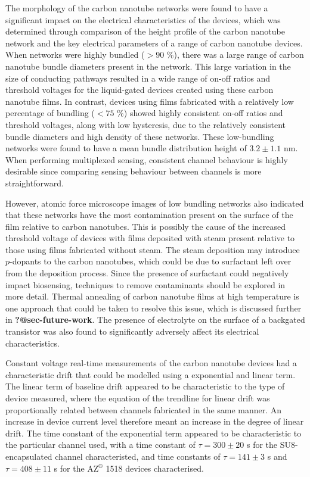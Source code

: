 \documentclass[
  a4paper,
]{scrbook}
\begin{document}
The morphology of the carbon nanotube networks were found to have a
significant impact on the electrical characteristics of the devices,
which was determined through comparison of the height profile of the
carbon nanotube network and the key electrical parameters of a range of
carbon nanotube devices. When networks were highly bundled (\(>90\) \%),
there was a large range of carbon nanotube bundle diameters present in
the network. This large variation in the size of conducting pathways
resulted in a wide range of on-off ratios and threshold voltages for the
liquid-gated devices created using these carbon nanotube films. In
contrast, devices using films fabricated with a relatively low
percentage of bundling (\(<75\) \%) showed highly consistent on-off
ratios and threshold voltages, along with low hysteresis, due to the
relatively consistent bundle diameters and high density of these
networks. These low-bundling networks were found to have a mean bundle
distribution height of \(3.2 \pm 1.1\) nm. When performing multiplexed
sensing, consistent channel behaviour is highly desirable since
comparing sensing behaviour between channels is more straightforward.

However, atomic force microscope images of low bundling networks also
indicated that these networks have the most contamination present on the
surface of the film relative to carbon nanotubes. This is possibly the
cause of the increased threshold voltage of devices with films deposited
with steam present relative to those using films fabricated without
steam. The steam deposition may introduce \(p\)-dopants to the carbon
nanotubes, which could be due to surfactant left over from the
deposition process. Since the presence of surfactant could negatively
impact biosensing, techniques to remove contaminants should be explored
in more detail. Thermal annealing of carbon nanotube films at high
temperature is one approach that could be taken to resolve this issue,
which is discussed further in \textbf{?@sec-future-work}. The presence
of electrolyte on the surface of a backgated transistor was also found
to significantly adversely affect its electrical characteristics.

Constant voltage real-time measurements of the carbon nanotube devices
had a characteristic drift that could be modelled using a exponential
and linear term. The linear term of baseline drift appeared to be
characteristic to the type of device measured, where the equation of the
trendline for linear drift was proportionally related between channels
fabricated in the same manner. An increase in device current level
therefore meant an increase in the degree of linear drift. The time
constant of the exponential term appeared to be characteristic to the
particular channel used, with a time constant of \(\tau = 300 \pm 20\) s
for the SU8-encapsulated channel characteristed, and time constants of
\(\tau = 141 \pm 3\) s and \(\tau = 408 \pm 11\) s for the
AZ\(^\circledR\) 1518 devices characterised.
\end{document}
